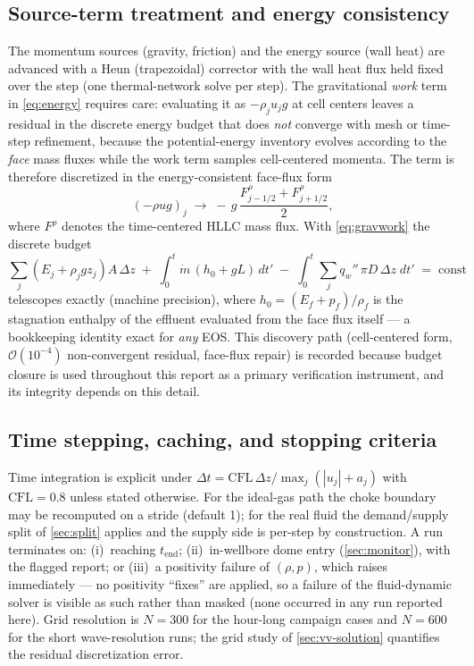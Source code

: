 \documentclass[11pt]{article}
\newcommand{\mdot}{\dot{m}}
\begin{document}
\subsection{Source-term treatment and energy consistency}
\label{sec:sources}

The momentum sources (gravity, friction) and the energy source (wall
heat) are advanced with a Heun (trapezoidal) corrector with the wall
heat flux held fixed over the step (one thermal-network solve per
step). The gravitational \emph{work} term in \cref{eq:energy} requires
care: evaluating it as $-\rho_j u_j g$ at cell centers leaves a
residual in the discrete energy budget that does \emph{not} converge
with mesh or time-step refinement, because the potential-energy
inventory evolves according to the \emph{face} mass fluxes while the
work term samples cell-centered momenta. The term is therefore
discretized in the energy-consistent face-flux form
\begin{equation}
\left(-\rho u g\right)_j \;\longrightarrow\;
 -\,g\,\frac{F^{\rho}_{j-1/2} + F^{\rho}_{j+1/2}}{2},
\label{eq:gravwork}
\end{equation}
where $F^{\rho}$ denotes the time-centered HLLC mass flux. With
\cref{eq:gravwork} the discrete budget
\begin{equation}
\sum_j \left(E_j + \rho_j g z_j\right) A\,\Delta z
\;+\; \int_0^t \mdot\,\left(h_0 + gL\right)\,dt'
\;-\; \int_0^t\!\! \sum_j q_w''\,\pi D\,\Delta z\;dt'
\;=\; \text{const}
\label{eq:budget}
\end{equation}
telescopes exactly (machine precision), where $h_0 = (E_f + p_f)/
\rho_f$ is the stagnation enthalpy of the effluent evaluated from the
face flux itself --- a bookkeeping identity exact for \emph{any} EOS.
This discovery path (cell-centered form, $\mathcal{O}(10^{-4})$
non-convergent residual, face-flux repair) is recorded because budget
closure is used throughout this report as a primary verification
instrument, and its integrity depends on this detail.

\subsection{Time stepping, caching, and stopping criteria}

Time integration is explicit under
$\Delta t = \mathrm{CFL}\,\Delta z / \max_j\left(|u_j| + a_j\right)$
with $\mathrm{CFL} = 0.8$ unless stated otherwise. For the ideal-gas
path the choke boundary may be recomputed on a stride (default 1); for
the real fluid the demand/supply split of \cref{sec:split} applies
and the supply side is per-step by construction. A run terminates on:
(i)~reaching $t_{\mathrm{end}}$; (ii)~in-wellbore dome entry
(\cref{sec:monitor}), with the flagged report; or (iii)~a positivity
failure of $(\rho, p)$, which raises immediately --- no positivity
``fixes'' are applied, so a failure of the fluid-dynamic solver is
visible as such rather than masked (none occurred in any run reported
here). Grid resolution is $N = 300$ for the hour-long campaign cases
and $N = 600$ for the short wave-resolution runs; the grid study of
\cref{sec:vv-solution} quantifies the residual discretization error.
\end{document}
